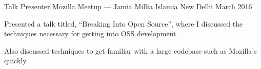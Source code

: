 
\begin{cventries}

\cventry%
  {Talk Presenter} %
  {Mozilla Meetup --- Jamia Millia Islamia} %
  {New Delhi} %
  {March 2016} %
  {%
    \begin{cvitems} %
      \item{Presented a talk titled, ``Breaking Into Open Source'', where I
            discussed the techniques necessary for getting into OSS
            development.}
      \item{Also discussed techniques to get familiar with a large codebase
            such as Mozilla's quickly.}
    \end{cvitems}
  }

\end{cventries}
